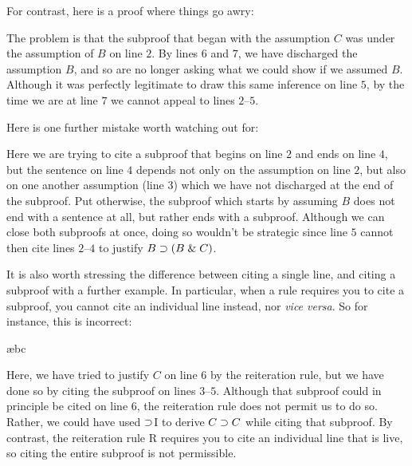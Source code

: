 For contrast, here is a proof where things go awry:
\begin{fitchproof}
 \pr{}
\open
	 
	\open
		 
	\close
\close
{}
\end{fitchproof}
The problem is that the subproof that began with the assumption $C$ was under the assumption of $B$ on line $2$.
By lines $6$ and $7$, we have discharged the assumption $B$, and so are no longer asking what we could show if we assumed $B$.
Although it was perfectly legitimate to draw this same inference on line $5$, by the time we are at line $7$ we cannot appeal to lines $2$--$5$.

Here is one further mistake worth watching out for:
\begin{fitchproof}
 \pr{}
\open
	 
	\open
		 
	\close
\close
\end{fitchproof}
Here we are trying to cite a subproof that begins on line $2$ and ends on line $4$, but the sentence on line $4$ depends not only on the assumption on line $2$, but also on one another assumption (line $3$) which we have not discharged at the end of the subproof.
Put otherwise, the subproof which starts by assuming $B$ does not end with a sentence at all, but rather ends with a subproof. 
Although we can close both subproofs at once, doing so wouldn't be strategic since line $5$ cannot then cite lines $2$--$4$ to justify $B \supset (B \mathrel\& C)$.

It is also worth stressing the difference between citing a single line, and citing a subproof with a further example.
In particular, when a rule requires you to cite a subproof, you cannot cite an individual line instead, nor \textit{vice versa}.
So for instance, this is incorrect:
\begin{fitchproof}
 \pr{}
\open
	 
	\open
		 
	\ae{bc}
	\close
\close
{}
\end{fitchproof}
Here, we have tried to justify $C$ on line $6$ by the reiteration rule, but we have done so by citing the subproof on lines $3$--$5$.
Although that subproof could in principle be cited on line $6$, the reiteration rule does not permit us to do so.
Rather, we could have used $\supset$I to derive $C \supset C$ while citing that subproof.
By contrast, the reiteration rule R requires you to cite an individual line that is live, so citing the entire subproof is not permissible.

